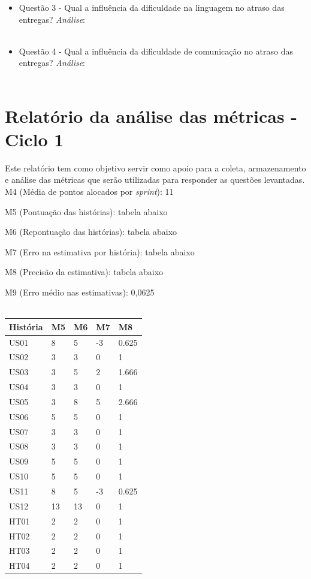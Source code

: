 \begin{apendicesenv}
\begin{itemize}
	  \item Questão 3 - Qual a influência da dificuldade na linguagem no atraso das entregas?
	    \subitem \textit{Análise}:
	  \\
	  \\
	  
	  \item Questão 4 - Qual a influência da dificuldade de comunicação no atraso das entregas?
	    \subitem \textit{Análise}:
	  \\
	  \\
	  
	\end{itemize}
	
	\chapter{Relatório da análise das métricas - Ciclo 1}
	
	Este relatório tem como objetivo servir como apoio para a coleta, armazenamento e análise das métricas que serão 
	utilizadas para responder as questões levantadas.
	\\
	

	M4 (Média de pontos alocados por \textit{sprint}): 11
	
	M5 (Pontuação das histórias): tabela abaixo
	
	M6 (Repontuação das histórias): tabela abaixo
	
	M7 (Erro na estimativa por história): tabela abaixo
	
	M8 (Precisão da estimativa): tabela abaixo
	
	M9 (Erro médio nas estimativas): 0,0625
	\\
	\\
	
\begin{tabular}{ | l | l | l | l | l | }
\hline
História & M5 & M6 & M7 & M8 \\ \hline
US01 & 8 & 5 & -3 & 0.625 \\ \hline
US02 & 3 & 3 & 0 & 1 \\ \hline
US03 & 3 & 5 & 2 & 1.666 \\ \hline
US04 & 3 & 3 & 0 & 1 \\ \hline
US05 & 3 & 8 & 5 & 2.666 \\ \hline
US06 & 5 & 5 & 0 & 1 \\ \hline
US07 & 3 & 3 & 0 & 1 \\ \hline
US08 & 3 & 3 & 0 & 1 \\ \hline
US09 & 5 & 5 & 0 & 1 \\ \hline
US10 & 5 & 5 & 0 & 1 \\ \hline
US11 & 8 & 5 & -3 & 0.625 \\ \hline
US12 & 13 & 13 & 0 & 1 \\ \hline
HT01 & 2 & 2 & 0 & 1 \\ \hline
HT02 & 2 & 2 & 0 & 1 \\ \hline
HT03 & 2 & 2 & 0 & 1 \\ \hline
HT04 & 2 & 2 & 0 & 1 \\ \hline
\end{tabular}
	

\end{apendicesenv}
